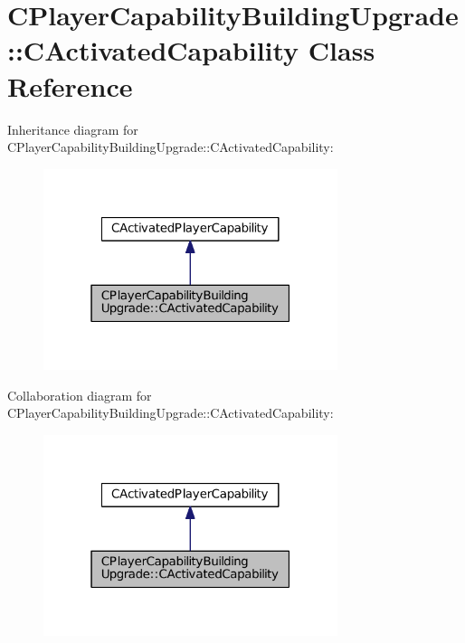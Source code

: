 \hypertarget{classCPlayerCapabilityBuildingUpgrade_1_1CActivatedCapability}{}\section{C\+Player\+Capability\+Building\+Upgrade\+:\+:C\+Activated\+Capability Class Reference}
\label{classCPlayerCapabilityBuildingUpgrade_1_1CActivatedCapability}


Inheritance diagram for C\+Player\+Capability\+Building\+Upgrade\+:\+:C\+Activated\+Capability\+:\nopagebreak
\begin{figure}[H]
\begin{center}
\leavevmode
\includegraphics[width=244pt]{classCPlayerCapabilityBuildingUpgrade_1_1CActivatedCapability__inherit__graph}
\end{center}
\end{figure}


Collaboration diagram for C\+Player\+Capability\+Building\+Upgrade\+:\+:C\+Activated\+Capability\+:\nopagebreak
\begin{figure}[H]
\begin{center}
\leavevmode
\includegraphics[width=244pt]{classCPlayerCapabilityBuildingUpgrade_1_1CActivatedCapability__coll__graph}
\end{center}
\end{figure}
